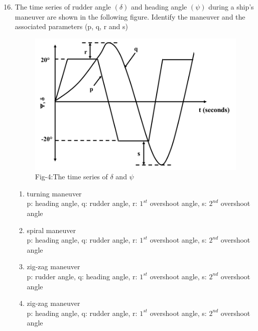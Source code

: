 \documentclass[journal]{IEEEtran}
\theoremstyle{remark}
\begin{document}
\begin{enumerate}[itemsep=1em]
\setcounter{enumi}{15}
\item The time series of rudder angle $(\delta)$ and heading angle $(\psi)$ during a ship's maneuver are shown in the following figure. Identify the maneuver and the associated parameters (p, q, r and s)
\begin{figure}[H]
    \centering
    \includegraphics[width=0.4\columnwidth]{figs/fig-4.jpeg}
    \caption*{Fig-4:The time series of $\delta$ and $\psi$}
    \label{fig-4}
\end{figure}
\begin{enumerate}[leftmargin=2.5em, labelsep=0.5em, itemsep=0.5em]
    \item turning maneuver \\
p: heading angle, q: rudder angle, r: $1^{st}$ overshoot angle, s: $2^{nd}$ overshoot angle 
    \item spiral maneuver \\
p: heading angle, q: rudder angle, r: $1^{st}$ overshoot angle, s: $2^{nd}$ overshoot angle 
    \item zig-zag maneuver \\
p: rudder angle, q: heading angle, r: $1^{st}$ overshoot angle, s: $2^{nd}$ overshoot angle
    \item zig-zag maneuver \\
p: heading angle, q: rudder angle, r: $1^{st}$ overshoot angle, s: $2^{nd}$ overshoot angle
\end{enumerate}

\end{enumerate}
\end{document}
